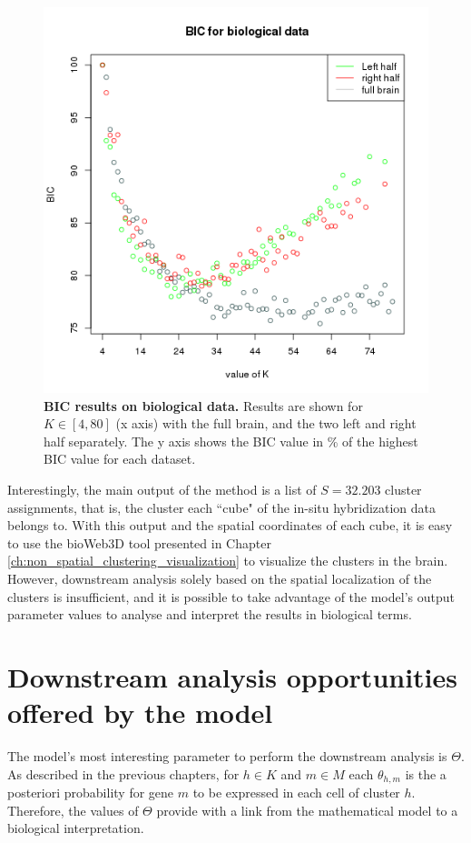 	\begin{figure}[h]
\centerline{\includegraphics[width=0.8\linewidth]{gfx/chapter6/real_BIC.png}}
\caption{{\bf BIC results on biological data.} Results are shown for $K \in [4,80]$ (x axis) with the full brain, and the two left and right half separately. The y axis shows the BIC value in \% of the highest BIC value for each dataset.}
\label{fig:realBIC}
	\end{figure} 
	
	
	Interestingly, the main output of the method is a list of $S=32.203$ cluster assignments, that is, the cluster each ``cube" of the in-situ hybridization data belongs to. With this output and the spatial coordinates of each cube, it is easy to use the bioWeb3D tool presented in Chapter \ref{ch:non_spatial_clustering_visualization} to visualize the clusters in the brain. However, downstream analysis solely based on the spatial localization of the clusters is insufficient, and it is possible to take advantage of the model's output parameter values to analyse and interpret the results in biological terms.

	\section{Downstream analysis opportunities offered by the model}
	The model's most interesting parameter to perform the downstream analysis is $\Theta$. As described in the previous chapters,  for $h \in K$ and $m \in M$ each $\theta_{h,m}$ is the a posteriori probability for gene $m$ to be expressed in each cell of cluster $h$. Therefore, the values of $\Theta$ provide with a link from the mathematical model to a biological interpretation.\\
	
